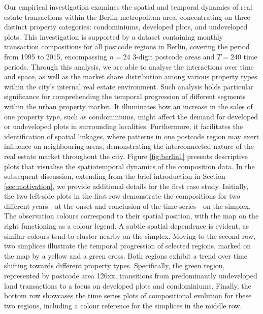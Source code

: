 \documentclass[12pt]{article}
\theoremstyle{plain}
\theoremstyle{definition}
\begin{document}
\textcolor{black}{Our} empirical investigation examines the spatial and temporal dynamics of real estate transactions within the Berlin metropolitan area, concentrating on three distinct property categories: condominiums, developed plots, and undeveloped plots. This investigation is supported by a dataset containing monthly transaction compositions for all postcode regions in Berlin, covering the period from 1995 to 2015, encompassing $n = 24$ 3-digit postcode areas and $T = 240$ time periods. Through this analysis, we are able to analyse the interactions over time and space, as well as the market share distribution among various property types within the city's internal real estate environment. Such analysis holds particular significance for comprehending the temporal progression of different segments within the urban property market. It illuminates how an increase in the sales of one property type, such as condominiums, might affect the demand for developed or undeveloped plots in surrounding localities. Furthermore, it facilitates the identification of spatial linkages, where patterns in one postcode region may exert influence on neighbouring areas, demonstrating the interconnected nature of the real estate market throughout the city. Figure \ref{fig:berlin1} presents descriptive plots that visualise the spatiotemporal dynamics of the composition data. In the subsequent discussion, extending from the brief introduction in Section \ref{sec:motivation}, we provide additional details for the first case study. Initially, the two left-side plots in the first row demonstrate the compositions for two different years—at the onset and conclusion of the time series—on the simplex. The observation colours correspond to their spatial position, with the map on the right functioning as a colour legend. A subtle spatial dependence is evident, as similar colours tend to cluster nearby on the simplex. Moving to the second row, two simplices illustrate the temporal progression of selected regions, marked on the map by a yellow and a green cross. Both regions exhibit a trend over time shifting towards different property types. Specifically, the green region, represented by postcode area 126xx, transitions from predominantly undeveloped land transactions to a focus on developed plots and condominiums. Finally, the bottom row showcases the time series plots of compositional evolution for these two regions, including a colour reference for the simplices \textcolor{black}{in the middle row}.
\end{document}

